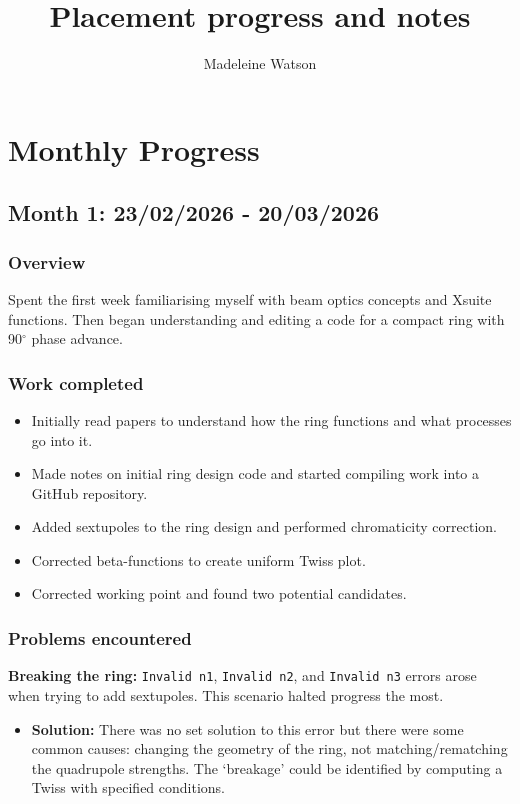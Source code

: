 \documentclass{article}
\title{Placement progress and notes}
\author{Madeleine Watson}
\begin{document}
\maketitle

\tableofcontents

\section{Monthly Progress}
\subsection{Month 1: 23/02/2026 - 20/03/2026}
\subsubsection{Overview}

Spent the first week familiarising myself with beam optics concepts and Xsuite functions. Then began understanding and editing a code for a compact ring with 90$^\circ$ phase advance.

\subsubsection{Work completed}

\begin{itemize}
\item Initially read papers to understand how the ring functions and what processes go into it.
\item Made notes on initial ring design code and started compiling work into a GitHub repository.
\item Added sextupoles to the ring design and performed chromaticity correction.
\item Corrected beta-functions to create uniform Twiss plot.
\item Corrected working point and found two potential candidates.
\end{itemize}

\subsubsection{Problems encountered}

\textbf{Breaking the ring:} \texttt{Invalid n1}, \texttt{Invalid n2}, and \texttt{Invalid n3} errors arose when trying to add sextupoles. This scenario halted progress the most.
\begin{itemize}
    \item \textbf{Solution:} There was no set solution to this error but there were some common causes: changing the geometry of the ring, not matching/rematching the quadrupole strengths. The `breakage' could be identified by computing a Twiss with specified conditions.
\end{itemize}
\end{document}
